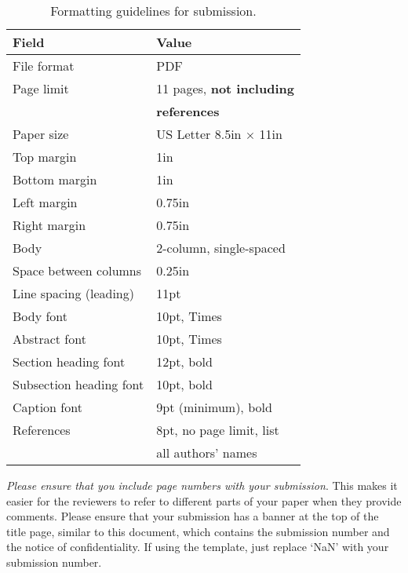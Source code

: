 \documentclass[conference]{IEEEtran}
\begin{document}
\begin{scriptsize}
\begin{table}[h!]
  \centering
  \caption{Formatting guidelines for submission.}
  \label{table:formatting}
  \begin{tabular}{|l|l|}
    \hline
    \textbf{Field} & \textbf{Value}\\
    \hline
    \hline
    File format & PDF \\
    \hline
    Page limit & 11 pages, {\bf not including}\\
               & {\bf references}\\
    \hline
    Paper size & US Letter 8.5in $\times$ 11in\\
    \hline
    Top margin & 1in\\
    \hline
    Bottom margin & 1in\\
    \hline
    Left margin & 0.75in\\
    \hline
    Right margin & 0.75in\\
    \hline
    Body & 2-column, single-spaced\\
    \hline
    Space between columns & 0.25in\\
    \hline
    Line spacing (leading) & 11pt \\
    \hline
    Body font & 10pt, Times\\
    \hline
    Abstract font & 10pt, Times\\
    \hline
    Section heading font & 12pt, bold\\
    \hline
    Subsection heading font & 10pt, bold\\
    \hline
    Caption font & 9pt (minimum), bold\\
    \hline
    References & 8pt, no page limit, list \\
               & all authors' names\\
    \hline
  \end{tabular}
\end{table}
\end{scriptsize}

{\em Please ensure that you include page numbers with your
  submission}. This makes it easier for the reviewers to refer to
different parts of your paper when they provide comments. Please
ensure that your submission has a banner at the top of the title page,
similar to this document, which contains the submission number and the
notice of confidentiality.  If using the template, just replace `NaN'
with your submission number.
\end{document}
